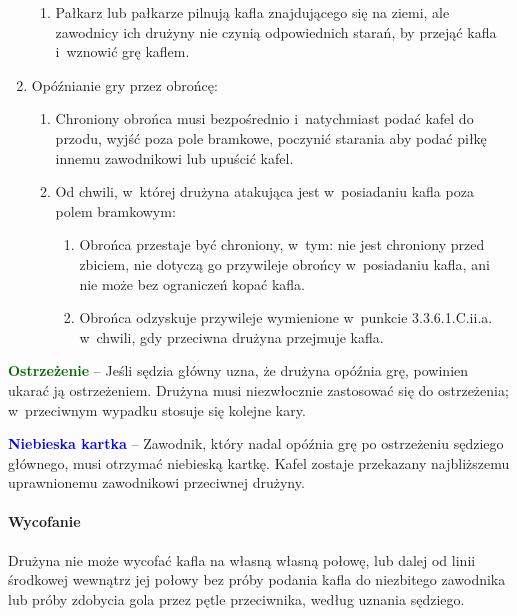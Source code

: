 \documentclass[12pt,a4paper]{article}
\newcommand\bluecard[1]{\bgroup\textcolor{blue}{\textbf{#1}}}
\newcommand\other[1]{\bgroup\textcolor{darkgreen}{\textbf{#1}}}
\begin{document}
\begin{enumerate}
\begin{enumerate}
		      \item Pałkarz lub pałkarze pilnują kafla znajdującego się na ziemi, ale
		            zawodnicy ich drużyny nie czynią odpowiednich starań, by przejąć kafla i~wznowić grę kaflem.
	      \end{enumerate}

	\item Opóźnianie gry przez obrońcę:
	      \begin{enumerate}
		      \item Chroniony obrońca musi bezpośrednio i~natychmiast podać
		            kafel do przodu, wyjść poza pole bramkowe, poczynić starania aby
		            podać piłkę innemu zawodnikowi lub upuścić kafel.

		      \item Od chwili, w~której drużyna atakująca jest w~posiadaniu kafla poza
		            polem bramkowym:
		            \begin{enumerate}
			            \item Obrońca przestaje być chroniony, w~tym: nie jest chroniony przed
			                  zbiciem, nie dotyczą go przywileje obrońcy w~posiadaniu kafla, ani nie
			                  może bez ograniczeń kopać kafla.

			            \item Obrońca odzyskuje przywileje wymienione w~punkcie 3.3.6.1.C.ii.a.
			                  w~chwili, gdy przeciwna drużyna przejmuje kafla.
		            \end{enumerate}
	      \end{enumerate}
\end{enumerate}

\other{Ostrzeżenie} -- Jeśli sędzia główny uzna, że drużyna
opóźnia grę, powinien ukarać ją ostrzeżeniem. Drużyna musi
niezwłocznie zastosować się do ostrzeżenia; w~przeciwnym wypadku stosuje
się kolejne kary.

\bluecard{Niebieska kartka} -- Zawodnik, który nadal opóźnia grę po
ostrzeżeniu sędziego głównego, musi otrzymać niebieską kartkę. Kafel
zostaje przekazany najbliższemu uprawnionemu zawodnikowi przeciwnej
drużyny.

\paragraph{Wycofanie}
Drużyna nie może wycofać kafla na własną
własną połowę, lub dalej od linii środkowej wewnątrz jej połowy bez
próby podania kafla do niezbitego zawodnika lub próby zdobycia
gola przez pętle przeciwnika, według uznania sędziego.
\end{document}
